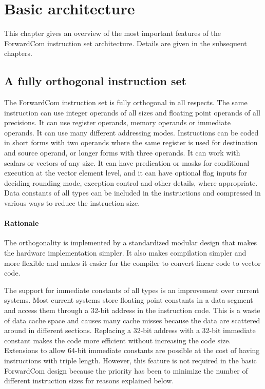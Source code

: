 \documentclass[forwardcom.tex]{subfiles}
\begin{document}
\RaggedRight

\chapter{Basic architecture}

This chapter gives an overview of the most important features of the ForwardCom instruction set architecture. Details are given in the subsequent chapters.

\section{A fully orthogonal instruction set}
The ForwardCom instruction set is fully orthogonal in all respects. The same instruction can use integer operands of all sizes and floating point operands of all precisions. It can use register operands, memory operands or immediate operands. It can use many different addressing modes. Instructions can be coded in short forms with two operands where the same register is used for destination and source operand, or longer forms with three operands. It can work with scalars or vectors of any size. It can have predication or masks for conditional execution at the vector element level, and it can have optional flag inputs for deciding rounding mode, exception control and other details, where appropriate. Data constants of all types can be included in the instructions and compressed in various ways to reduce the instruction size.

\subsubsection{Rationale}
The orthogonality is implemented by a standardized modular design that makes the hardware implementation simpler. It also makes compilation simpler and more flexible and makes it easier for the compiler to convert linear code to vector code.
\vspace{2mm}

The support for immediate constants of all types is an improvement over current systems. Most current systems store floating point constants in a data segment and access them through a 32-bit address in the instruction code. This is a waste of data cache space and causes many cache misses because the data are scattered around in different sections. Replacing a 32-bit address with a 32-bit immediate constant makes the code more efficient without increasing the code size. Extensions to allow 64-bit immediate constants are possible at the cost of having instructions with triple length. However, this feature is not required in the basic ForwardCom design because the priority has been to minimize the number of different instruction sizes for reasons explained below.
\end{document}

